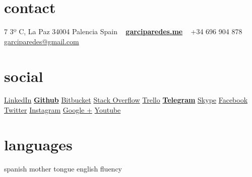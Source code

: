 \documentclass[]{friggeri-cv} %
\begin{document}


\begin{aside} %
\section{contact}
7 3º C, La Paz
34004 Palencia
Spain
~
\href{http://garciparedes.me}{\textbf{garciparedes.me}}
~
+34 696 904 878
\href{mailto:garciparedes@gmail.com}{garciparedes@gmail.com} 
\section{social}
\href{http://facebook.com/garciparedes}{LinkedIn\quad\faLinkedin } 
\href{http://facebook.com/garciparedes}{\textbf{Github}\quad\faGithub }
\href{http://facebook.com/garciparedes}{Bitbucket\quad\faBitbucket }
\href{http://facebook.com/garciparedes}{Stack Overflow\quad\faStackOverflow } 
\href{http://facebook.com/garciparedes}{Trello\quad\faTrello } 
\href{http://facebook.com/garciparedes}{\textbf{Telegram}\quad\faPaperPlane } 
\href{http://facebook.com/garciparedes}{Skype\quad\faSkype } 
\href{http://facebook.com/garciparedes}{Facebook\quad\faFacebook} 
\href{http://facebook.com/garciparedes}{Twitter\quad\faTwitter } 
\href{http://facebook.com/garciparedes}{Instagram\quad\faInstagram } 
\href{http://facebook.com/garciparedes}{Google +\quad\faGooglePlus } 
\href{http://facebook.com/garciparedes}{Youtube\quad\faYoutubePlay } 
\section{languages}
spanish mother tongue
english fluency
\begin{comment}
\section{programming}
Java\quad{\color{red} $\varheartsuit\varheartsuit\varheartsuit\varheartsuit\varheartsuit$}{\color{black} $\varheartsuit$} 
Python\quad{\color{red} $\varheartsuit\varheartsuit\varheartsuit$}{\color{black} $\varheartsuit\varheartsuit\varheartsuit$} 
JavaScript\quad{\color{red} $\varheartsuit\varheartsuit\varheartsuit\varheartsuit$}{\color{black} $\varheartsuit\varheartsuit$} 
 C\quad{\color{red} $\varheartsuit\varheartsuit\varheartsuit\varheartsuit$}{\color{black} $\varheartsuit\varheartsuit$} 
 C++\quad{\color{red} $\varheartsuit\varheartsuit\varheartsuit\varheartsuit$}{\color{black} $\varheartsuit\varheartsuit$} 

\end{comment}
\end{aside}
\end{document}
